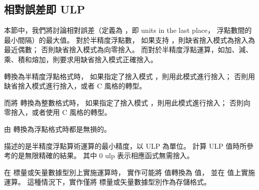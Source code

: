 \subsection[section:relativeErrorHalf]{相對誤差即 ULP}

本節中，我們將討論相對誤差（定義為 ，即 units in the last place，
浮點數間的最小間隔）的最大值。
對於半精度浮點數，
如果支持 ，則缺省捨入模式為捨入為最近偶數；
否則缺省捨入模式為向零捨入。
而對於半精度浮點運算，如加、減、乘、積和熔加，則要求用缺省捨入模式正確捨入。

轉換為半精度浮點格式時，
如果指定了捨入模式 ，則用此模式進行捨入；
否則用缺省捨入模式進行捨入，或者 C 風格的轉型。

而將  轉換為整數格式時，
如果指定了捨入模式 ，則用此模式進行捨入；
否則向零捨入，或者使用 C 風格的轉型。

由  轉換為浮點格式時都是無損的。

描述的是半精度浮點算術運算的最小精度，以 ULP 為單位。
計算 ULP 值時所參考的是無限精確的結果。
其中 0 ulp 表示相應函式無需捨入。

{}

\startnotepar
在  標量或矢量數據型別上實施運算時，
實作可能將  值轉換為  值，
並在  值上實施運算。
這種情況下，實作僅將  標量或矢量數據型別作為存儲格式。
\stopnotepar

